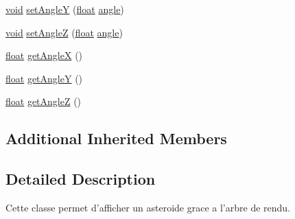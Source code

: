 \begin{DoxyCompactItemize}
\item 
\hyperlink{wglew_8h_aeea6e3dfae3acf232096f57d2d57f084}{void} \hyperlink{class_noeud_asteroide_a22a25b8240e0d3bb45e3295192dd42e9}{set\-Angle\-Y} (\hyperlink{fmod_8h_aeb841aa4b4b5f444b5d739d865b420af}{float} \hyperlink{glew_8h_a6d7a98b0d979b9411a4344a98a7a6122}{angle})
\item 
\hyperlink{wglew_8h_aeea6e3dfae3acf232096f57d2d57f084}{void} \hyperlink{class_noeud_asteroide_a8674615a93c162a4fdc17768ab0aef0c}{set\-Angle\-Z} (\hyperlink{fmod_8h_aeb841aa4b4b5f444b5d739d865b420af}{float} \hyperlink{glew_8h_a6d7a98b0d979b9411a4344a98a7a6122}{angle})
\item 
\hyperlink{fmod_8h_aeb841aa4b4b5f444b5d739d865b420af}{float} \hyperlink{class_noeud_asteroide_a80b8db5ca5b9ae9ae14da2397aab19b5}{get\-Angle\-X} ()
\item 
\hyperlink{fmod_8h_aeb841aa4b4b5f444b5d739d865b420af}{float} \hyperlink{class_noeud_asteroide_a7b242e9e31832e72914cb31493521f3e}{get\-Angle\-Y} ()
\item 
\hyperlink{fmod_8h_aeb841aa4b4b5f444b5d739d865b420af}{float} \hyperlink{class_noeud_asteroide_a8c5d24777b1f52bdc9a630250e46a3dc}{get\-Angle\-Z} ()
\end{DoxyCompactItemize}
\subsection*{Additional Inherited Members}


\subsection{Detailed Description}
Cette classe permet d'afficher un asteroide grace a l'arbre de rendu. 

